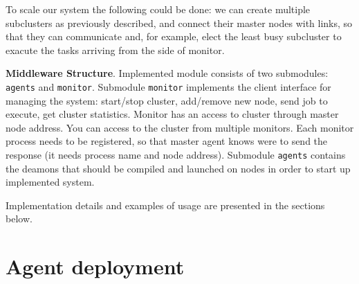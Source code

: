 \documentclass[12pt]{article}
\newcommand\MyFive[2]{%
  \foreach \x in {1,...,5}{
    \pgfmathparse{(\x-1)*72+floor(\x/6)*36 + 90 - 90*#2}
    \node[draw,circle,inner sep=5pt,text width=1cm, align=center] (#1-\x) at (\pgfmathresult:2.5cm){ \ifthenelse{1 = \x}{Master Node}{Node $\x$}};
  }
  \foreach \x [count=\xi from 1] in {1,...,5}{
    \foreach \y in {\x,...,5}{
    \path (#1-\xi) edge[-] (#1-\y);
  }
}
}
\begin{document}
To scale our system the following could be done: we can create multiple subclusters as previously described, and connect their master nodes with links, so that they can communicate and, for example, elect the least busy subcluster to exacute the tasks arriving from the side of monitor. 

	\begin{center}
	
	\end{center}


\textbf{Middleware Structure}. Implemented module consists of two submodules: \texttt{agents} and \texttt{monitor}. Submodule \texttt{monitor} implements the client interface for managing the system: start/stop cluster, add/remove new node, send job to execute, get cluster statistics. Monitor has an access to cluster through master node address. You can access to the cluster from multiple monitors. Each monitor process needs to be registered, so that master agent knows were to send the response (it needs process name and node address). Submodule \texttt{agents} contains the deamons that should be compiled and launched on nodes in order to start up implemented system. 

Implementation details and examples of usage are presented in the sections below.

\section{Agent deployment}
\end{document}
